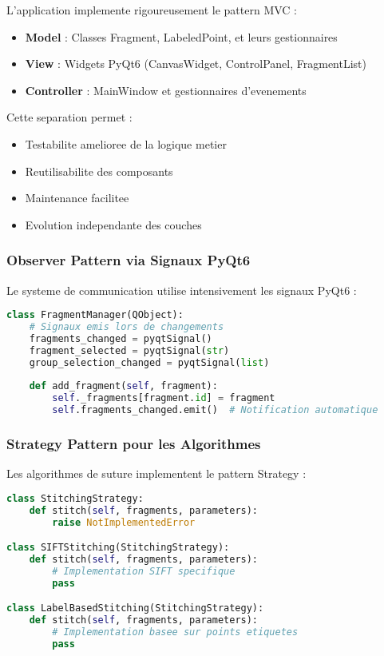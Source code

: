 \documentclass[12pt,a4paper]{article}
\begin{document}
L'application implemente rigoureusement le pattern MVC :

\begin{itemize}
\item \textbf{Model} : Classes Fragment, LabeledPoint, et leurs gestionnaires
\item \textbf{View} : Widgets PyQt6 (CanvasWidget, ControlPanel, FragmentList)
\item \textbf{Controller} : MainWindow et gestionnaires d'evenements
\end{itemize}

Cette separation permet :
\begin{itemize}
\item Testabilite amelioree de la logique metier
\item Reutilisabilite des composants
\item Maintenance facilitee
\item Evolution independante des couches
\end{itemize}

\subsubsection{Observer Pattern via Signaux PyQt6}

Le systeme de communication utilise intensivement les signaux PyQt6 :

\begin{lstlisting}[language=Python]
class FragmentManager(QObject):
    # Signaux emis lors de changements
    fragments_changed = pyqtSignal()
    fragment_selected = pyqtSignal(str)
    group_selection_changed = pyqtSignal(list)
    
    def add_fragment(self, fragment):
        self._fragments[fragment.id] = fragment
        self.fragments_changed.emit()  # Notification automatique
\end{lstlisting}

\subsubsection{Strategy Pattern pour les Algorithmes}

Les algorithmes de suture implementent le pattern Strategy :

\begin{lstlisting}[language=Python]
class StitchingStrategy:
    def stitch(self, fragments, parameters):
        raise NotImplementedError

class SIFTStitching(StitchingStrategy):
    def stitch(self, fragments, parameters):
        # Implementation SIFT specifique
        pass

class LabelBasedStitching(StitchingStrategy):
    def stitch(self, fragments, parameters):
        # Implementation basee sur points etiquetes
        pass
\end{lstlisting}
\end{document}
